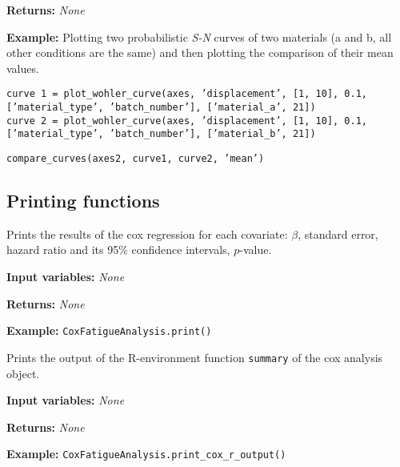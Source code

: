 \documentclass[twoside,a4paper]{refart}
\begin{document}
\textbf{Returns:} \textit{None}

\textbf{Example:}
Plotting two probabilistic \textit{S-N} curves  of two materials (a and b, all other conditions are the same) and then plotting the comparison of their mean values.

\texttt{curve 1 = plot\_wohler\_curve(axes, 'displacement', [1, 10], 0.1,} \\
\texttt{['material\_type', 'batch\_number'], ['material\_a', 21])} \\
\texttt{curve 2 = plot\_wohler\_curve(axes, 'displacement', [1, 10], 0.1,} \\
\texttt{['material\_type', 'batch\_number'], ['material\_b', 21])}

\texttt{compare\_curves(axes2, curve1, curve2, 'mean')}



\subsection{Printing functions}

Prints the results of the cox regression for each covariate: $\beta$, standard error, hazard ratio and its 95\% confidence intervals, $p$-value.

\textbf{Input variables:} \textit{None}

\textbf{Returns:} \textit{None}

\textbf{Example:} \texttt{CoxFatigueAnalysis.print()}


Prints the output of the R-environment function \texttt{summary} of the cox analysis object.

\textbf{Input variables:} \textit{None}

\textbf{Returns:} \textit{None}

\textbf{Example:} \texttt{CoxFatigueAnalysis.print\_cox\_r\_output()}


\printindex
\end{document}
